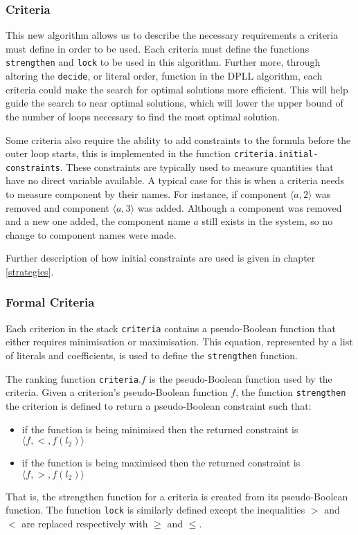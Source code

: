 \subsubsection{Criteria}
This new algorithm allows us to describe the necessary requirements a criteria must define in order to be used.
Each criteria must define the functions \verb+strengthen+ and \verb+lock+ to be used in this algorithm.
Further more, through altering the \verb+decide+, or literal order, function in the DPLL algorithm, each criteria could make the search for optimal solutions more efficient.
This will help guide the search to near optimal solutions, which will lower the upper bound of the number of loops necessary to find the most optimal solution.

Some criteria also require the ability to add constraints to the formula before the outer loop starts,
this is implemented in the function \verb+criteria.initial-constraints+.
These constraints are typically used to measure quantities that have no direct variable available.
A typical case for this is when a criteria needs to measure component by their names.
For instance, if component $\langle a,2\rangle$ was removed and component $\langle a,3 \rangle$ was added. 
Although a component was removed and a new one added, the component name $a$ still exists in the system, so no change to component names were made.

Further description of how initial constraints are used is given in chapter \ref{strategies}. 

\subsubsection{Formal Criteria}
Each criterion in the stack \verb+criteria+ contains a pseudo-Boolean function that either requires minimisation or maximisation.
This equation, represented by a list of literals and coefficients, is used to define the \verb+strengthen+ function.

The ranking function \verb+criteria+.$f$ is the pseudo-Boolean function used by the criteria.
Given a criterion's pseudo-Boolean function $f$,
the function \verb+strengthen+ the criterion is defined to return a pseudo-Boolean constraint such that:
\begin{itemize}
  \item if the function is being minimised then the returned constraint is $\langle f,<,f(l_2) \rangle$
  \item if the function is being maximised then the returned constraint is $\langle f,>,f(l_2) \rangle$
\end{itemize}
That is, the strengthen function for a criteria is created from its pseudo-Boolean function.
The function \verb+lock+ is similarly defined except the inequalities $>$ and $<$ are replaced respectively with $\geq$ and $\leq$.

